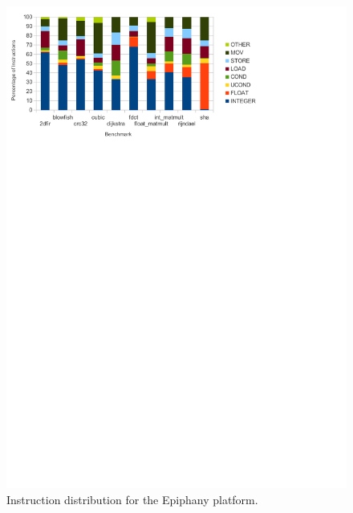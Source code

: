 \documentclass[twocolumn]{article}
\begin{document}
\begin{figure}[t]
	\includegraphics[width=\linewidth,clip, trim=0 8.5in 2in 0]{epiphany.pdf}
	\caption{Instruction distribution for the Epiphany platform.}
	\label{Fig:InstructionDistributionEpiphany}
\end{figure}
\end{document}
